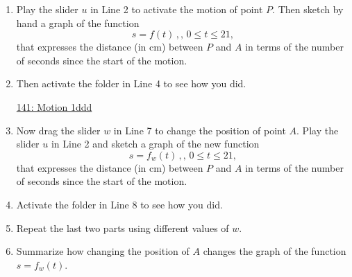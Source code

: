 \documentclass{ximera}
\begin{document}
\begin{exploration}\label{exp:Bugs25}

\begin{enumerate}

\item Play the slider $u$ in Line 2 to activate the motion of point $P$. Then sketch by hand a graph of the function
\[
     s = f(t) \, , , \, 0\leq t \leq 21,
\]
that expresses the distance (in cm) between $P$ and $A$ in terms of the number of seconds since the start of the motion.

\item Then activate the folder in Line 4 to see how you did.

 
\begin{onlineOnly}
    \begin{center}
\end{center}
\end{onlineOnly}

\href{https://www.desmos.com/calculator/w9b0ybzvrh}{141: Motion 1ddd}

\item Now drag the slider $w$ in Line 7 to change the position of point $A$. Play the slider $u$ in Line 2 and sketch a graph of the new function
\[
     s = f_w(t) \, , , \, 0\leq t \leq 21,
\] 
that expresses the distance (in cm) between $P$ and $A$ in terms of the number of seconds since the start of the motion.

\item Activate the folder in Line 8 to see how you did.

\item Repeat the last two parts using different values of $w$.

\item Summarize how changing the position of $A$ changes the graph of the function $s=f_w(t)$.

\end{enumerate}
\end{exploration}
\end{document}
